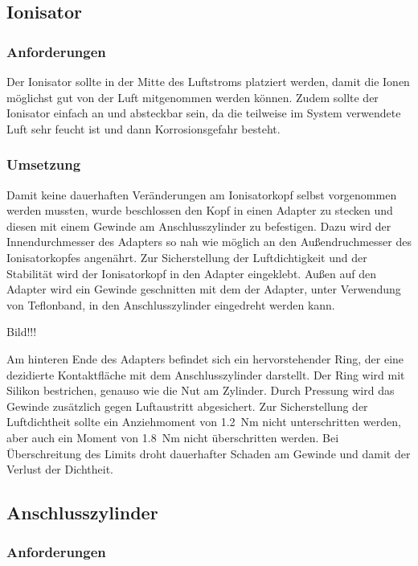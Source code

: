 \subsection{Ionisator}

\subsubsection{Anforderungen}

Der Ionisator sollte in der Mitte des Luftstroms platziert werden, damit die Ionen möglichst gut von der Luft mitgenommen werden können. Zudem sollte der Ionisator einfach an und absteckbar sein, da die teilweise im System verwendete Luft sehr feucht ist und dann Korrosionsgefahr besteht.

\subsubsection{Umsetzung}

Damit keine dauerhaften Veränderungen am Ionisatorkopf selbst vorgenommen werden mussten, wurde beschlossen den Kopf in einen Adapter zu stecken und diesen mit einem Gewinde am Anschlusszylinder zu befestigen. Dazu wird der Innendurchmesser des Adapters so nah wie möglich an den Außendruchmesser des Ionisatorkopfes angenährt. Zur Sicherstellung der Luftdichtigkeit und der Stabilität wird der Ionisatorkopf in den Adapter eingeklebt. Außen auf den Adapter wird ein Gewinde geschnitten mit dem der Adapter, unter Verwendung von Teflonband, in den Anschlusszylinder eingedreht werden kann.

Bild!!!

Am hinteren Ende des Adapters befindet sich ein hervorstehender Ring, der eine dezidierte Kontaktfläche mit dem Anschlusszylinder darstellt. Der Ring wird mit Silikon bestrichen, genauso wie die Nut am Zylinder. Durch Pressung wird das Gewinde zusätzlich gegen Luftaustritt abgesichert. Zur Sicherstellung der Luftdichtheit sollte ein Anziehmoment von \SI{1,2}{Nm} nicht unterschritten werden, aber auch ein Moment von \SI{1,8}{Nm} nicht überschritten werden. Bei Überschreitung des Limits droht dauerhafter Schaden am Gewinde und damit der Verlust der Dichtheit.


\newpage

\subsection{Anschlusszylinder}

\subsubsection{Anforderungen}


